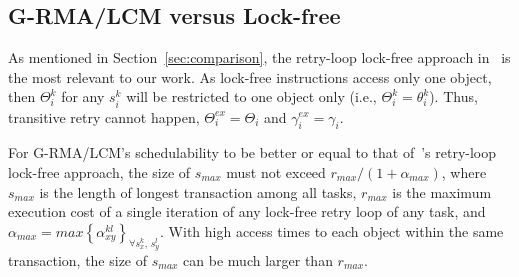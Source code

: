 \subsection{G-RMA/LCM versus Lock-free}\label{g-rma lcm vs lock-free}
%
As mentioned in Section~\ref{sec:comparison}, the retry-loop lock-free approach in~\cite{key-5} is the most relevant to our work. As lock-free instructions access only one object, then $\Theta_i^k$ for any $s_i^k$ will be restricted to one object only (i.e., $\Theta_i^k=\theta_i^k$). Thus, transitive retry cannot happen, $\Theta_i^{ex}=\Theta_i$ and $\gamma_i^{ex}=\gamma_i$.
%
\begin{clm}\label{lcm rma lock-free comparison clm}
%
For G-RMA/LCM's schedulability to be better or equal to that of~\cite{key-5}'s retry-loop lock-free approach, the size of $s_{max}$ must not exceed $r_{max}/\left(1+\alpha_{max}\right)$, where $s_{max}$ is the length of longest transaction among all tasks, $r_{max}$ is the maximum execution cost of a single iteration of any lock-free retry loop of any task, and  $\alpha_{max}=max\left\{\alpha_{xy}^{kl}\right\}_{\forall s_x^k,\,s_y^l}$. With high access times to each object within the same transaction, the size of $s_{max}$ can be much larger than $r_{max}$.
%
\end{clm}
%
